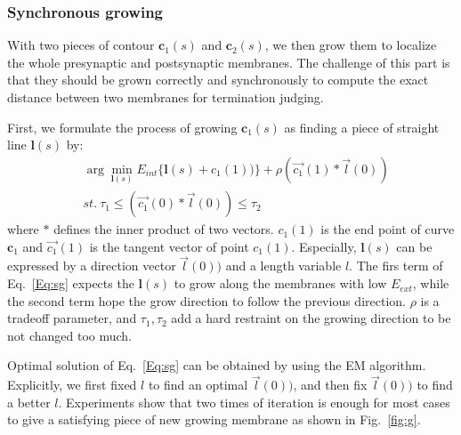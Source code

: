 \subsubsection{Synchronous growing}
With two pieces of contour $\mathbf{c}_1(s)$ and $\mathbf{c}_2(s)$, we then grow them to localize the whole presynaptic and postsynaptic membranes.
The challenge of this part is that they should be grown correctly and synchronously to compute the exact distance between two membranes for termination judging.

First, we formulate the process of growing $\mathbf{c}_1(s)$ as finding a piece of straight line $\mathbf{l}(s)$ by:
\begin{eqnarray}\label{Eq:sg}
&\arg\min_{\mathbf{l}(s)} E_{int}\{\mathbf{l}(s)+c_1(1))\}+\rho(\overrightarrow{c_1}(1)*\overrightarrow{l}(0))\\
&st.~\tau_1\leq (\overrightarrow{c_1}(0)*\overrightarrow{l}(0))\leq \tau_2\nonumber
\end{eqnarray}
where $*$ defines the inner product of two vectors.
$c_1(1)$ is the end point of curve $\mathbf{c}_1$ and $\overrightarrow{c_1}(1)$ is the tangent vector of point $c_1(1)$.
Especially, $\mathbf{l}(s)$ can be expressed by a direction vector $\overrightarrow{l}(0))$ and a length variable $l$.
The firs term of Eq.~\ref{Eq:sg} expects the $\mathbf{l}(s)$ to grow along the membranes with low $E_{ext}$, while the second term hope the grow direction to follow the previous direction.
$\rho$ is a tradeoff parameter, and $\tau_1,\tau_2$ add a hard restraint on the growing direction to be not changed too much.

Optimal solution of Eq.~\ref{Eq:sg} can be obtained by using the EM algorithm.
Explicitly, we first fixed $l$ to find an optimal $\overrightarrow{l}(0))$, and then fix $\overrightarrow{l}(0))$ to find a better $l$.
Experiments show that two times of iteration is enough for most cases to give a satisfying piece of new growing membrane as shown in Fig.~\ref{fig:g}.

